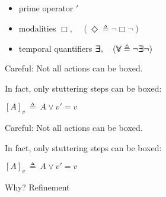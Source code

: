 {
\begin{itemize}
  \item prime operator $'$
\end{itemize}

\vspace{62pt}

\begin{itemize}
  \item modalities $\Box, \quad (\Diamond \triangleq       \neg \Box \neg)$
  \item temporal quantifiers $\exists \hspace{-4.5pt} \exists, \quad (\forall \hspace{-4.5pt} \forall \triangleq \neg \exists \hspace{-4.5pt} \exists \neg)$
\end{itemize}
\vspace{15pt}
}


{
\hspace{-18pt} {\color{Maroon} Careful: \hfill Not all actions can be boxed.} \\
\vspace{25pt}

In fact, only {\color{Maroon} stuttering} steps can be boxed: \\

\begin{center} $[A]_v \ \triangleq\  A \vee v' = v$ \end{center} 

\vspace{75pt}
}


{
\hspace{-18pt} {\color{Maroon} Careful: \hfill Not all actions can be boxed.} \\
\vspace{25pt}

 In fact, only {\color{Maroon} stuttering} steps can be boxed: \\

\begin{center} $[A]_v \ \triangleq\  A \vee v' = v$ \end{center} 

\hspace{-18pt} {\color{Maroon} Why? \hfill Refinement}\\

\vspace{63pt}
}



